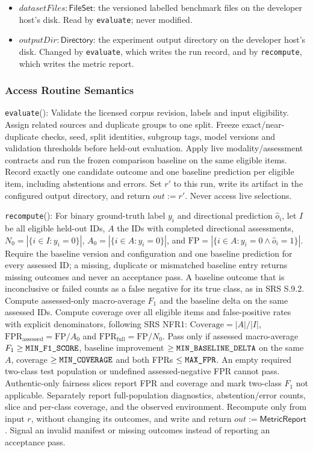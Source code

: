 \documentclass[12pt, titlepage]{article}
\newcommand{\ty}[1]{\textsf{#1}}
\newcommand{\Const}[1]{\texttt{#1}}
\begin{document}
\begin{itemize}
\item $\mathit{datasetFiles}:\ty{FileSet}$: the versioned labelled benchmark files on the developer host's disk. Read by \texttt{evaluate}; never modified.
\item $\mathit{outputDir}:\ty{Directory}$: the experiment output directory on the developer host's disk. Changed by \texttt{evaluate}, which writes the run record, and by \texttt{recompute}, which writes the metric report.
\end{itemize}

\subsubsection{Access Routine Semantics}

\noindent \texttt{evaluate}():
Validate the licensed corpus revision, labels and input eligibility. Assign related sources and duplicate groups to one split. Freeze exact/near-duplicate checks, seed, split identities, subgroup tags, model versions and validation thresholds before held-out evaluation. Apply live modality/assessment contracts and run the frozen comparison baseline on the same eligible items. Record exactly one candidate outcome and one baseline prediction per eligible item, including abstentions and errors. Set $r'$ to this run, write its artifact in the configured output directory, and return $out:=r'$. Never access live selections.

\medskip\noindent \texttt{recompute}():
For binary ground-truth label $y_i$ and directional prediction $\hat o_i$, let $I$ be all eligible held-out IDs, $A$ the IDs with completed directional assessments, $N_0=|\{i\in I:y_i=0\}|$, $A_0=|\{i\in A:y_i=0\}|$, and $\mathrm{FP}=|\{i\in A:y_i=0\land\hat o_i=1\}|$. Require the baseline version and configuration and one baseline prediction for every assessed ID; a missing, duplicate or mismatched baseline entry returns missing outcomes and never an acceptance pass. A baseline outcome that is inconclusive or failed counts as a false negative for its true class, as in SRS S.9.2. Compute assessed-only macro-average $F_1$ and the baseline delta on the same assessed IDs. Compute coverage over all eligible items and false-positive rates with explicit denominators, following SRS NFR1: $\mathrm{Coverage}=|A|/|I|$, $\mathrm{FPR}_{\mathrm{assessed}}=\mathrm{FP}/A_0$ and $\mathrm{FPR}_{\mathrm{full}}=\mathrm{FP}/N_0$. Pass only if assessed macro-average $F_1\ge\Const{MIN\_\allowbreak{}F1\_\allowbreak{}SCORE}$, baseline improvement $\ge\Const{MIN\_\allowbreak{}BASELINE\_\allowbreak{}DELTA}$ on the same $A$, coverage $\ge\Const{MIN\_\allowbreak{}COVERAGE}$ and both FPRs $\le\Const{MAX\_\allowbreak{}FPR}$. An empty required two-class test population or undefined assessed-negative FPR cannot pass. Authentic-only fairness slices report FPR and coverage and mark two-class $F_1$ not applicable. Separately report full-population diagnostics, abstention/error counts, slice and per-class coverage, and the observed environment. Recompute only from input $r$, without changing its outcomes, and write and return $out:=\ty{MetricReport}$. Signal an invalid manifest or missing outcomes instead of reporting an acceptance pass.
\end{document}
